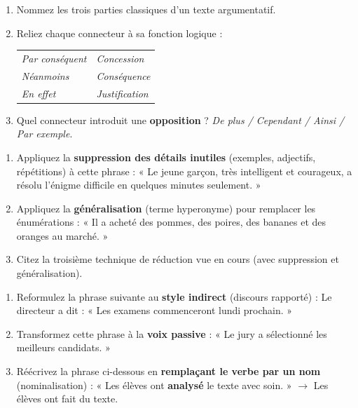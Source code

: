 \documentclass[11pt]{article}
\begin{document}
\begin{exercice}
\begin{enumerate}
    \item Nommez les trois parties classiques d'un texte argumentatif.
    \item Reliez chaque connecteur à sa fonction logique :
    \begin{tabular}{ll}
        \textit{Par conséquent} & \textit{Concession} \\
        \textit{Néanmoins}      & \textit{Conséquence} \\
        \textit{En effet}       & \textit{Justification} \\
    \end{tabular}
    \item Quel connecteur introduit une \textbf{opposition} ? \textit{De plus / Cependant / Ainsi / Par exemple}.
\end{enumerate}
\end{exercice}

\begin{exercice}
\begin{enumerate}
    \item Appliquez la \textbf{suppression des détails inutiles} (exemples, adjectifs, répétitions) à cette phrase :
    « Le jeune garçon, très intelligent et courageux, a résolu l'énigme difficile en quelques minutes seulement. »
    \item Appliquez la \textbf{généralisation} (terme hyperonyme) pour remplacer les énumérations :
    « Il a acheté des pommes, des poires, des bananes et des oranges au marché. »
    \item Citez la troisième technique de réduction vue en cours (avec suppression et généralisation).
\end{enumerate}
\end{exercice}

\begin{exercice}
\begin{enumerate}
    \item Reformulez la phrase suivante au \textbf{style indirect} (discours rapporté) :
    Le directeur a dit : « Les examens commenceront lundi prochain. »
    \item Transformez cette phrase à la \textbf{voix passive} :
    « Le jury a sélectionné les meilleurs candidats. »
    \item Réécrivez la phrase ci-dessous en \textbf{remplaçant le verbe par un nom} (nominalisation) :
    « Les élèves ont \textbf{analysé} le texte avec soin. » $\rightarrow$ Les élèves ont fait \underline{\hspace{5cm}} du texte.
\end{enumerate}
\end{exercice}
\end{document}

